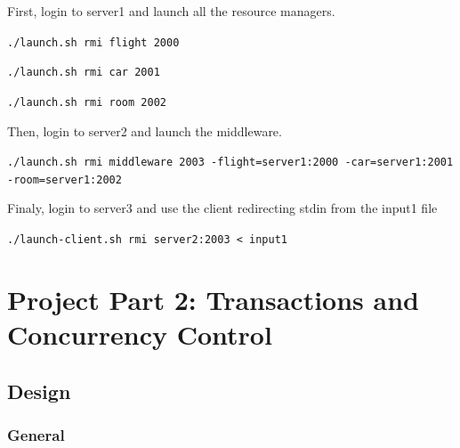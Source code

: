 \documentclass[a4paper]{article}
\begin{document}
First, login to server1 and launch all the resource managers.

{\tt ./launch.sh rmi flight 2000}

{\tt ./launch.sh rmi car 2001}

{\tt ./launch.sh rmi room 2002}

Then, login to server2 and launch the middleware.

{\tt ./launch.sh rmi middleware 2003 -flight=server1:2000 -car=server1:2001 -room=server1:2002}

Finaly, login to server3 and use the client redirecting stdin from the input1 file
 
{\tt ./launch-client.sh rmi server2:2003 < input1}

\section{Project Part 2: Transactions and Concurrency Control}
\subsection{Design}
\subsubsection{General}
\end{document}
